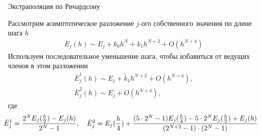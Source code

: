 \documentclass[10pt,pdf,hyperref={unicode},xcolor=dvipsnames]{beamer}
\begin{document}
\begin{frame}{Экстраполяция по Ричардсону}
    \begin{block}{}
        \vspace*{-1cm}
        Рассмотрим асимптотическое разложение $j$-ого собственного значения по длине шага $h$  
        \begin{gather}
            E_j(h) \sim E_j + k_0 h^N + k_1 h^{N+2} + O(h^{N+4})
        \end{gather}
        Используем последовательное уменьшение шага, чтобы избавиться от ведущих членов в этом разложении
        \begin{gather}
            \bar{E}_j^1(h) \sim E_j + \tilde{k}_1 h^{N+2} + O(h^{N+4}), \\
            \bar{E}_j^2(h) \sim E_j + O(h^{N+4}),
        \end{gather}
        где
        \begin{gather}
            \hspace*{-0.3cm}
            \bar{E}_j^1 = \frac{2^N E_j(\frac{h}{2}) - E_j(h)}{2^N - 1}, \quad 
            \bar{E}_j^2 = E_j(\frac{h}{4}) + \frac{(5 \cdot 2^N - 1) E_j(\frac{h}{4}) - 5\cdot 2^N E_j(\frac{h}{2}) + E_j(h)}{(2^{N+2} - 1) \cdot (2^N - 1)} \notag
        \end{gather}
    \end{block}
\end{frame}
\end{document}
